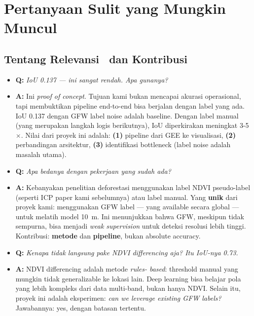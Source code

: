 \documentclass[10pt,a4paper,onecolumn]{article}
\begin{document}
\section{Pertanyaan Sulit yang Mungkin Muncul}

\subsection{Tentang Relevansi \ dan Kontribusi}

\begin{itemize}
    \item{\textbf{Q:} \textit{IoU 0.137 — ini sangat rendah. Apa
          gunanya?}}
    \item{\textbf{A:} Ini \textit{proof of concept}. Tujuan kami
          bukan mencapai akurasi operasional, tapi membuktikan
          pipeline end-to-end bisa berjalan dengan label yang ada.
          IoU 0.137 dengan GFW label noise adalah baseline. Dengan
          label manual (yang merupakan langkah logis berikutnya),
          IoU diperkirakan meningkat 3-5$\times$. Nilai dari proyek
          ini adalah: \textbf{(1)} pipeline dari GEE ke visualisasi,
          \textbf{(2)} perbandingan arsitektur, \textbf{(3)} identifikasi
          bottleneck (label noise adalah masalah utama).}
\end{itemize}

\begin{itemize}
    \item{\textbf{Q:} \textit{Apa bedanya dengan pekerjaan yang sudah
          ada?}}
    \item{\textbf{A:} Kebanyakan penelitian deforestasi menggunakan
          label NDVI pseudo-label (seperti ICP paper kami sebelumnya)
          atau label manual. Yang \textbf{unik} dari proyek kami:
          menggunakan GFW label — yang available secara global — untuk
          melatih model 10~m. Ini menunjukkan bahwa GFW, meskipun
          tidak sempurna, bisa menjadi \textit{weak supervision} untuk
          deteksi resolusi lebih tinggi. Kontribusi: \textbf{metode}
          dan \textbf{pipeline}, bukan absolute accuracy.}
\end{itemize}

\begin{itemize}
    \item{\textbf{Q:} \textit{Kenapa tidak langsung pake NDVI
          differencing aja? Itu IoU-nya 0.73.}}
    \item{\textbf{A:} NDVI differencing adalah metode \textit{rules-
          based}: threshold manual yang mungkin tidak generalizable
          ke lokasi lain. Deep learning bisa belajar pola yang lebih
          kompleks dari data multi-band, bukan hanya NDVI. Selain
          itu, proyek ini adalah eksperimen: \textit{can we leverage
          existing GFW labels?} Jawabannya: yes, dengan batasan
          tertentu.}
\end{itemize}
\end{document}
